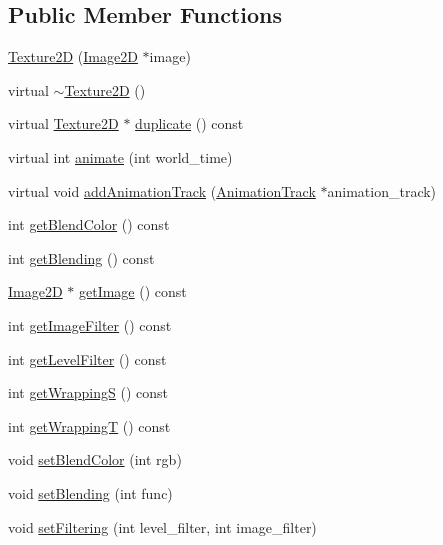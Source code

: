 \subsection*{Public Member Functions}
\begin{CompactItemize}
\item 
\hyperlink{classm3g_1_1Texture2D_7a8d6431e41022e29ac936afc5e97b8e}{Texture2D} (\hyperlink{classm3g_1_1Image2D}{Image2D} $\ast$image)
\item 
virtual \hyperlink{classm3g_1_1Texture2D_060332aea614a81a914cd2e55f1794df}{$\sim$Texture2D} ()
\item 
virtual \hyperlink{classm3g_1_1Texture2D}{Texture2D} $\ast$ \hyperlink{classm3g_1_1Texture2D_f4b50abcea8e4a6d6981c779d5009c05}{duplicate} () const 
\item 
virtual int \hyperlink{classm3g_1_1Texture2D_8aad1ceab4c2a03609c8a42324ce484d}{animate} (int world\_\-time)
\item 
virtual void \hyperlink{classm3g_1_1Texture2D_415c0b110f95410ded9b85e5d99a496b}{addAnimationTrack} (\hyperlink{classm3g_1_1AnimationTrack}{AnimationTrack} $\ast$animation\_\-track)
\item 
int \hyperlink{classm3g_1_1Texture2D_b7dc7b7bf2934448281894f2c1ef3638}{getBlendColor} () const 
\item 
int \hyperlink{classm3g_1_1Texture2D_078954de3d786bd11dc98b06f237bbbb}{getBlending} () const 
\item 
\hyperlink{classm3g_1_1Image2D}{Image2D} $\ast$ \hyperlink{classm3g_1_1Texture2D_a8c0193b0e7d47d4b5c9f60df24c44f5}{getImage} () const 
\item 
int \hyperlink{classm3g_1_1Texture2D_7b1e1ea0acc3d2096d346afdecc2ea5f}{getImageFilter} () const 
\item 
int \hyperlink{classm3g_1_1Texture2D_039f7813e846bedec1aaf4c413c15924}{getLevelFilter} () const 
\item 
int \hyperlink{classm3g_1_1Texture2D_6bdb583791178dc5002f4d0ae88293a9}{getWrappingS} () const 
\item 
int \hyperlink{classm3g_1_1Texture2D_58375e5e8ddde63dcf74f882d053ae3f}{getWrappingT} () const 
\item 
void \hyperlink{classm3g_1_1Texture2D_b5a6333203f443fb1f66ea2e39d4de1b}{setBlendColor} (int rgb)
\item 
void \hyperlink{classm3g_1_1Texture2D_189d98ce3e8ac7590be771944b3186d4}{setBlending} (int func)
\item 
void \hyperlink{classm3g_1_1Texture2D_857574b5c0f3e0ca9239bafb4008cae1}{setFiltering} (int level\_\-filter, int image\_\-filter)

\end{CompactItemize}
